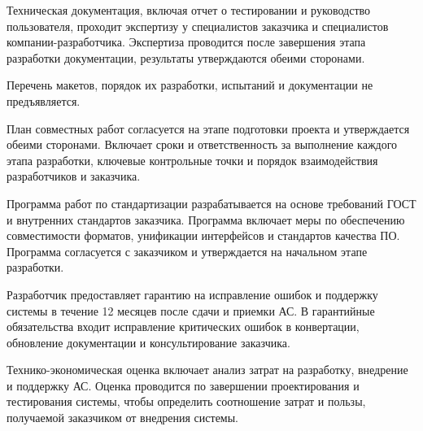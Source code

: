 
Техническая документация, включая отчет о тестировании
и руководство пользователя, проходит экспертизу у специалистов заказчика
и специалистов компании-разработчика.
Экспертиза проводится после завершения этапа разработки документации,
результаты утверждаются обеими сторонами. 


Перечень макетов, порядок их разработки, испытаний
и документации не предъявляется.


План совместных работ согласуется на этапе подготовки проекта
и утверждается обеими сторонами.
Включает сроки и ответственность за выполнение каждого этапа разработки,
ключевые контрольные точки и порядок взаимодействия разработчиков и заказчика. 


Программа работ по стандартизации разрабатывается на основе требований ГОСТ
и внутренних стандартов заказчика.
Программа включает меры по обеспечению совместимости форматов,
унификации интерфейсов и стандартов качества ПО.
Программа согласуется с заказчиком
и утверждается на начальном этапе разработки.


Разработчик предоставляет гарантию на исправление ошибок
и поддержку системы в течение 12 месяцев после сдачи и приемки АС.
В гарантийные обязательства входит исправление критических ошибок
в конвертации, обновление документации и консультирование заказчика.


Технико-экономическая оценка включает анализ затрат на разработку,
внедрение и поддержку АС.
Оценка проводится по завершении проектирования и тестирования системы,
чтобы определить соотношение затрат и пользы,
получаемой заказчиком от внедрения системы.


